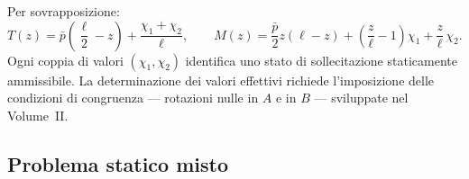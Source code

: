 \begin{esempio}
\begin{svolgimento}
		Per sovrapposizione:
		\[
		T(z) = \bar{p}\!\left(\frac{\ell}{2} - z\right)
		+ \frac{\chi_1 + \chi_2}{\ell},
		\qquad 
		M(z) = \frac{\bar{p}}{2}z(\ell - z)
		+ \left(\frac{z}{\ell} - 1\right)\chi_1
		+ \frac{z}{\ell}\,\chi_2.
		\]
		Ogni coppia di valori $(\chi_1, \chi_2)$
		identifica uno stato di sollecitazione
		staticamente ammissibile. La determinazione
		dei valori effettivi richiede l'imposizione
		delle condizioni di congruenza --- rotazioni
		nulle in $A$ e in $B$ --- sviluppate nel
		Volume~II.
		
	\end{svolgimento}
\end{esempio}


\subsection{Problema statico misto}
\label{sec:esempi_misto_iper}

